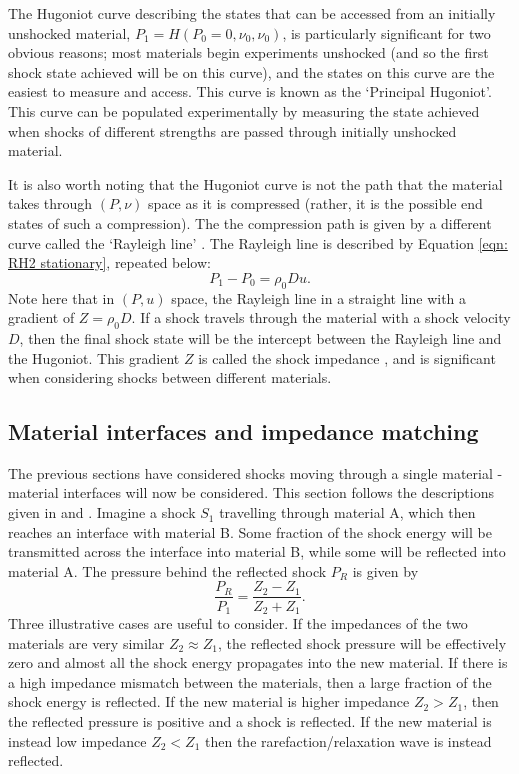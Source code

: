 The Hugoniot curve describing the states that can be accessed from an initially unshocked material, $P_1 = H(P_0 = 0, \nu_0, \nu_0)$, is particularly significant for two obvious reasons; most materials begin experiments unshocked (and so the first shock state achieved will be on this curve), and the states on this curve are the easiest to measure and access. This curve is known as the `Principal Hugoniot'. This curve can be populated experimentally by measuring the state achieved when shocks of different strengths are passed through initially unshocked material.

It is also worth noting that the Hugoniot curve is not the path that the material takes through $(P, \nu)$ space as it is compressed (rather, it is the possible end states of such a compression). The the compression path is given by a different curve called the `Rayleigh line' \cite{Forbes2012}. The Rayleigh line is described by Equation \ref{eqn: RH2 stationary}, repeated below:
\begin{equation} P_1 - P_0 = \rho_0 D u.  \end{equation}
Note here that in $(P, u)$ space, the Rayleigh line in a straight line with a gradient of $Z = \rho_0 D$. If a shock travels through the material with a shock velocity $D$, then the final shock state will be the intercept between the Rayleigh line and the Hugoniot. This gradient $Z$ is called the shock impedance , and is significant when considering shocks between different materials. 

\subsection{Material interfaces and impedance matching}

The previous sections have considered shocks moving through a single material - material interfaces will now be considered. This section follows the descriptions given in \cite{Forbes2012} and \cite{Davison2008}. Imagine a shock $S_1$ travelling through material A, which then reaches an interface with material B. Some fraction of the shock energy will be transmitted across the interface into material B, while some will be reflected into material A. The pressure behind the reflected shock $P_R$ is given \cite{Colvin2013} by 
\begin{equation} \frac{P_R}{P_1} = \frac{Z_2 - Z_1}{Z_2 + Z_1}.  \end{equation}
Three illustrative cases are useful to consider. If the impedances of the two materials are very similar $Z_2 \approx Z_1$, the reflected shock pressure will be effectively zero and almost all the shock energy propagates into the new material. If there is a high impedance mismatch between the materials, then a large fraction of the shock energy is reflected. If the new material is higher impedance $Z_2 > Z_1$, then the reflected pressure is positive and a shock is reflected. If the new material is instead low impedance $Z_2 < Z_1$ then the rarefaction/relaxation wave is instead reflected.

